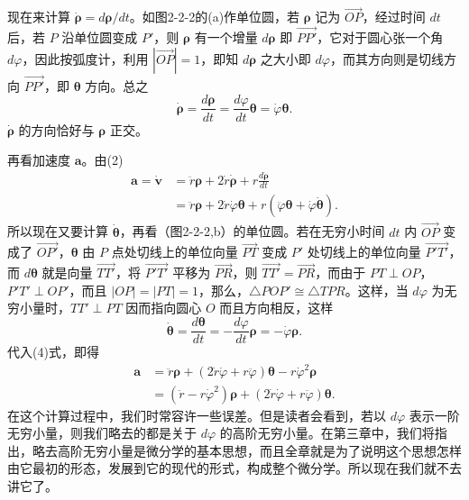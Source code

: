 现在来计算 $\dot{\boldsymbol\rho}=d\boldsymbol\rho/dt$。如图2-2-2的(a)作单位圆，若 $\boldsymbol\rho$ 记为 $\overrightarrow{OP}$，经过时间 $dt$ 后，若 $P$ 沿单位圆变成 $P'$，则 $\boldsymbol\rho$ 有一个增量 $d\boldsymbol\rho$ 即 $\overrightarrow{PP'}$，它对于圆心张一个角 $d\varphi$，因此按弧度计，利用 $|\overrightarrow{OP}|=1$，即知 $d\boldsymbol\rho$ 之大小即 $d\varphi$，而其方向则是切线方向 $\overrightarrow{PP'}$，即 $\boldsymbol\theta$ 方向。总之
\[
\dot{\boldsymbol\rho}=\frac{d\boldsymbol\rho}{dt}=\frac{d\varphi}{dt}\boldsymbol\theta=\dot\varphi\boldsymbol\theta. \tag{3}
\]
$\dot{\boldsymbol\rho}$ 的方向恰好与 $\boldsymbol\rho$ 正交。

再看加速度 $\boldsymbol a$。由(2)
\[
\begin{aligned}
\boldsymbol a=\dot{\boldsymbol v}
&=\ddot r\boldsymbol\rho+2\dot r\dot{\boldsymbol\rho}+r\frac{d\dot{\boldsymbol\rho}}{dt}\\
&=\ddot r\boldsymbol\rho+2\dot r\dot\varphi\boldsymbol\theta+r(\ddot\varphi\boldsymbol\theta+\dot\varphi\dot{\boldsymbol\theta}).
\end{aligned}\tag{4}
\]
所以现在又要计算 $\dot{\boldsymbol\theta}$，再看（图2-2-2,b）的单位圆。若在无穷小时间 $dt$ 内 $\overrightarrow{OP}$ 变成了 $\overrightarrow{OP'}$，$\boldsymbol\theta$ 由 $P$ 点处切线上的单位向量 $\overrightarrow{PT}$ 变成 $P'$ 处切线上的单位向量 $\overrightarrow{P'T'}$，而 $d\boldsymbol\theta$ 就是向量 $\overrightarrow{TT'}$，将 $\overrightarrow{P'T'}$ 平移为 $\overrightarrow{PR}$，则 $\overrightarrow{TT'}=\overrightarrow{PR}$，而由于 $PT\perp OP$，$P'T'\perp OP'$，而且 $|OP|=|PT|=1$，那么，$\triangle POP'\cong\triangle TPR$。这样，当 $d\varphi$ 为无穷小量时，$TT'\perp PT$ 因而指向圆心 $O$ 而且方向相反，这样
\[
\dot{\boldsymbol\theta}=\frac{d\boldsymbol\theta}{dt}=-\frac{d\varphi}{dt}\boldsymbol\rho=-\dot\varphi\boldsymbol\rho. \tag{5}
\]
代入(4)式，即得
\[
\begin{aligned}
\boldsymbol a
&=\ddot r\boldsymbol\rho+(2\dot r\dot\varphi+r\ddot\varphi)\boldsymbol\theta-r\dot\varphi^2\boldsymbol\rho\\
&=(\ddot r-r\dot\varphi^2)\boldsymbol\rho+(2\dot r\dot\varphi+r\ddot\varphi)\boldsymbol\theta.
\end{aligned}\tag{6}
\]
在这个计算过程中，我们时常容许一些误差。但是读者会看到，若以 $d\varphi$ 表示一阶无穷小量，则我们略去的都是关于 $d\varphi$ 的高阶无穷小量。在第三章中，我们将指出，略去高阶无穷小量是微分学的基本思想，而且全章就是为了说明这个思想怎样由它最初的形态，发展到它的现代的形式，构成整个微分学。所以现在我们就不去讲它了。

